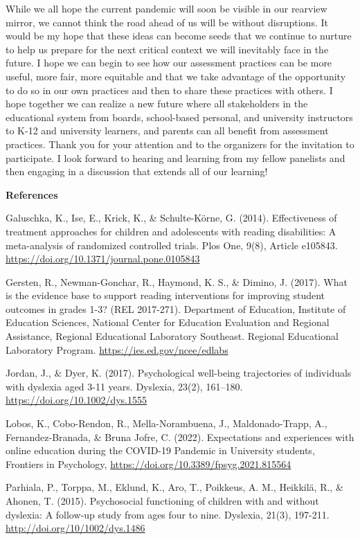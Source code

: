 \documentclass[
]{book}
\begin{document}
While we all hope the current pandemic will soon be visible in our rearview mirror, we cannot think the road ahead of us will be without disruptions. It would be my hope that these ideas can become seeds that we continue to nurture to help us prepare for the next critical context we will inevitably face in the future. I hope we can begin to see how our assessment practices can be more useful, more fair, more equitable and that we take advantage of the opportunity to do so in our own practices and then to share these practices with others. I hope together we can realize a new future where all stakeholders in the educational system from boards, school-based personal, and university instructors to K-12 and university learners, and parents can all benefit from assessment practices. Thank you for your attention and to the organizers for the invitation to participate. I look forward to hearing and learning from my fellow panelists and then engaging in a discussion that extends all of our learning!

\textbf{References}

Galuschka, K., Ise, E., Krick, K., \& Schulte-Körne, G. (2014). Effectiveness of treatment approaches for children and adolescents with reading disabilities: A meta-analysis of randomized controlled trials. Plos One, 9(8), Article e105843. \url{https://doi.org/10.1371/journal.pone.0105843}

Gersten, R., Newman-Gonchar, R., Haymond, K. S., \& Dimino, J. (2017). What is the evidence base to support reading interventions for improving student outcomes in grades 1-3? (REL 2017-271). Department of Education, Institute of Education Sciences, National Center for Education Evaluation and Regional Assistance, Regional Educational Laboratory Southeast. Regional Educational Laboratory Program. \url{https://ies.ed.gov/ncee/edlabs}

Jordan, J., \& Dyer, K. (2017). Psychological well-being trajectories of individuals with dyslexia aged 3-11 years. Dyslexia, 23(2), 161--180. \url{https://doi.org/10.1002/dys.1555}

Lobos, K., Cobo-Rendon, R., Mella-Norambuena, J., Maldonado-Trapp, A., Fernandez-Branada, \& Bruna Jofre, C. (2022). Expectations and experiences with online education during the COVID-19 Pandemic in University students, Frontiers in Psychology, \url{https://doi.org/10.3389/fpsyg.2021.815564}

Parhiala, P., Torppa, M., Eklund, K., Aro, T., Poikkeus, A. M., Heikkilä, R., \& Ahonen, T. (2015). Psychosocial functioning of children with and without dyslexia: A follow‐up study from ages four to nine. Dyslexia, 21(3), 197-211. \url{http://doi.org/10/1002/dys.1486}
\end{document}
